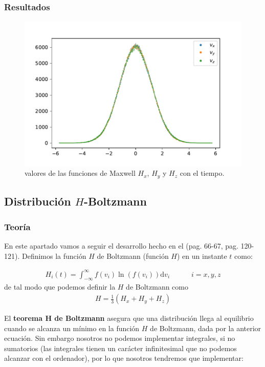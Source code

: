 \documentclass[11pt]{article} %
\newcommand{\parentesis}[1]{\left( #1  \right)}
\newcommand{\D}{\mathrm{d}}
\newcommand{\tquad}{\quad \quad \quad}
\begin{document}
\subsubsection{Resultados}
\begin{figure}[h!] \centering
	\includegraphics[width=1.0\textwidth]{../../Graficas/Velocidades_histo.pdf}
	\caption{valores de las funciones de Maxwell $H_x$, $H_y$ y $H_z$ con el tiempo.}
	\label{Fig:03}
\end{figure}	

	
\subsection{Distribución $H$-Boltzmann} 	
\subsubsection{Teoría}

En este apartado vamos a seguir el desarrollo hecho en el \cite{Haile} (pag. 66-67, pag. 120-121). Definimos la función $H$ de Boltzmann (función $H$) en un instante $t$ como:

\begin{eqnarray}
	H_i(t) = \int_{-\infty}^{\infty} f(v_i) \ln (f(v_i)) \D v_i \tquad i = x,y,z
\end{eqnarray} 
de tal modo que podemos definir la $H$ de Boltzmann como
\begin{eqnarray}
	H=\frac{1}{3} \parentesis{H_x+H_y+H_z}
\end{eqnarray}

El \textbf{teorema H de Boltzmann} asegura que una distribución llega al equilibrio cuando se alcanza un mínimo en la función $H$ de Boltzmann, dada por la anterior ecuación. Sin embargo nosotros no podemos implementar integrales, si no sumatorios (las integrales tienen un carácter infinitesimal que no podemos alcanzar con el ordenador), por lo que nosotros tendremos que implementar:
\end{document}
